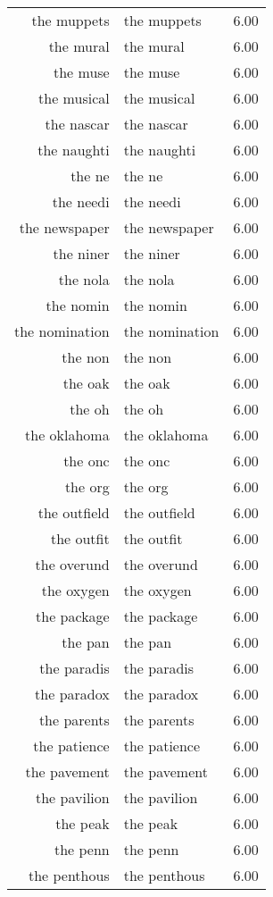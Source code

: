 \begin{table}[ht]
\begin{tabular}{rlr}
  the muppets & the muppets & 6.00 \\ 
  the mural & the mural & 6.00 \\ 
  the muse & the muse & 6.00 \\ 
  the musical & the musical & 6.00 \\ 
  the nascar & the nascar & 6.00 \\ 
  the naughti & the naughti & 6.00 \\ 
  the ne & the ne & 6.00 \\ 
  the needi & the needi & 6.00 \\ 
  the newspaper & the newspaper & 6.00 \\ 
  the niner & the niner & 6.00 \\ 
  the nola & the nola & 6.00 \\ 
  the nomin & the nomin & 6.00 \\ 
  the nomination & the nomination & 6.00 \\ 
  the non & the non & 6.00 \\ 
  the oak & the oak & 6.00 \\ 
  the oh & the oh & 6.00 \\ 
  the oklahoma & the oklahoma & 6.00 \\ 
  the onc & the onc & 6.00 \\ 
  the org & the org & 6.00 \\ 
  the outfield & the outfield & 6.00 \\ 
  the outfit & the outfit & 6.00 \\ 
  the overund & the overund & 6.00 \\ 
  the oxygen & the oxygen & 6.00 \\ 
  the package & the package & 6.00 \\ 
  the pan & the pan & 6.00 \\ 
  the paradis & the paradis & 6.00 \\ 
  the paradox & the paradox & 6.00 \\ 
  the parents & the parents & 6.00 \\ 
  the patience & the patience & 6.00 \\ 
  the pavement & the pavement & 6.00 \\ 
  the pavilion & the pavilion & 6.00 \\ 
  the peak & the peak & 6.00 \\ 
  the penn & the penn & 6.00 \\ 
  the penthous & the penthous & 6.00 \\ 

\end{tabular}
\end{table}
